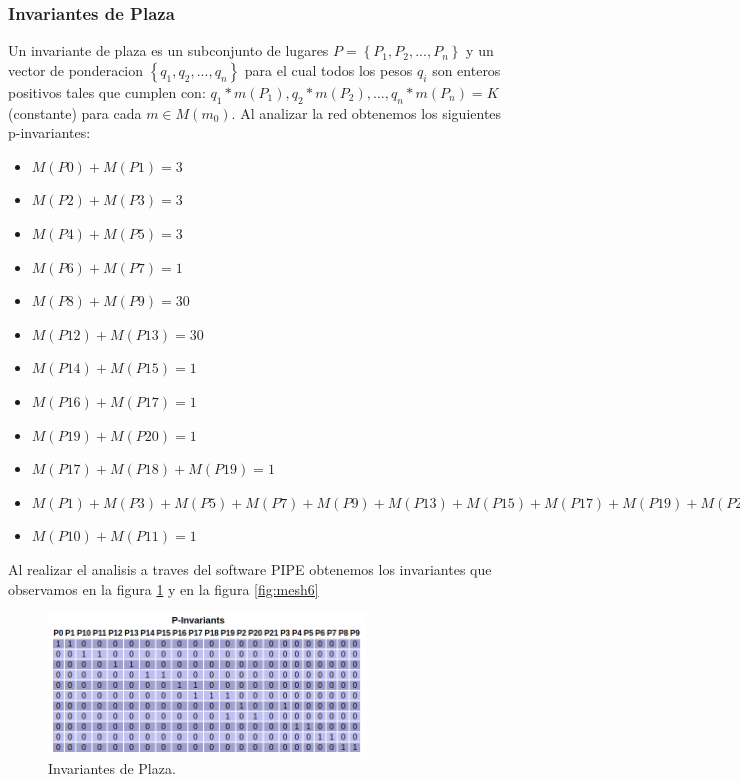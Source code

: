 \documentclass{article}
\begin{document}
		\subsubsection{Invariantes de Plaza}
		Un invariante de plaza es un subconjunto de lugares $P=\left\lbrace P_1,P_2,...,P_n \right\rbrace$ y un vector de ponderacion $\left\lbrace q_1,q_2,..., q_n \right\rbrace$ para el cual todos los pesos $q_i$ son enteros positivos tales que cumplen con:\newline
		$q_1*m(P_1),q_2*m(P_2),..., q_n*m(P_n)=K$ (constante) para cada $m\in M(m_0)$.\newline 
		Al analizar la red obtenemos los siguientes p-invariantes:
		\begin{itemize}
		\item $M(P0)+M(P1)=3$
		\item $M(P2)+M(P3)=3$
		\item $M(P4)+M(P5)=3$
		\item $M(P6)+M(P7)=1$
		\item $M(P8)+M(P9)=30$
		\item $M(P12)+M(P13)=30$
		\item $M(P14)+M(P15)=1$
		\item $M(P16)+M(P17)=1$
		\item $M(P19)+M(P20)=1$
		\item $M(P17)+M(P18)+M(P19)=1$
		\item $M(P1)+M(P3)+M(P5)+M(P7)+M(P9)+M(P13)+M(P15)+M(P17)+M(P19)+M(P21)=100$
		\item $M(P10)+M(P11)=1$
		\end{itemize}		
		Al realizar el analisis a traves del software PIPE obtenemos los invariantes que observamos en la figura \ref{fig:mesh5} y en la figura \ref{fig:mesh6} 
		\begin{figure}[H]
			\centering
			\includegraphics[width=0.75\textwidth]{Invariantes_P_Tabla}
			\caption{Invariantes de Plaza.}
			\label{fig:mesh5}
		\end{figure}
\end{document}
